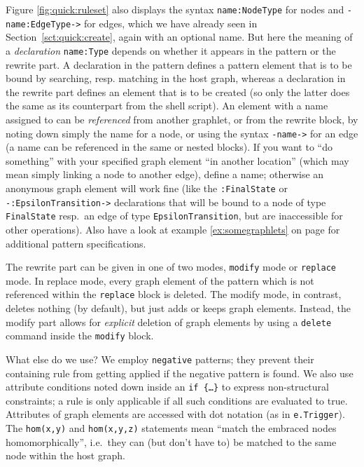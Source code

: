 Figure \ref{fig:quick:ruleset} also displays the syntax \texttt{name:NodeType} for nodes and \texttt{-name:EdgeType->} for edges, which we have already seen in Section~\ref{sct:quick:create}, again with an optional name.
But here the meaning of a \emph{declaration} \texttt{name:Type} depends on whether it appears in the pattern or the rewrite part.
A declaration in the pattern defines a pattern element that is to be bound by searching, resp. matching in the host graph, whereas a declaration in the rewrite part defines an element that is to be created (so only the latter does the same as its counterpart from the shell script).
An element with a name assigned to can be \emph{referenced} from another graphlet, or from the rewrite block, by noting down simply the name for a node, or using the syntax \texttt{-name->} for an edge (a name can be referenced in the same or nested blocks).
If you want to ``do something'' with your specified graph element ``in another location'' (which may mean simply linking a node to another edge), define a name; otherwise an anonymous graph element will work fine (like the \texttt{:FinalState} or \texttt{-:EpsilonTransition->} declarations that will be bound to a node of type \texttt{FinalState} resp.\ an edge of type \texttt{EpsilonTransition}, but are inaccessible for other operations).
Also have a look at example \ref{ex:somegraphlets} on page \pageref{ex:somegraphlets} for additional pattern specifications.

The rewrite part can be given in one of two modes, \texttt{modify} mode or \texttt{replace} mode.
In replace mode, every graph element of the pattern which is not referenced within the \texttt{replace} block is deleted.
The modify mode, in contrast, deletes nothing (by default), but just adds or keeps graph elements.
Instead, the modify part allows for \emph{explicit} deletion of graph elements by using a \texttt{delete} command inside the \texttt{modify} block.

What else do we use?
We employ \texttt{negative} patterns; they prevent their containing rule from getting applied if the negative pattern is found.
We also use attribute conditions noted down inside an \texttt{if \{\dots\}} to express non-structural constraints; a rule is only applicable if all such conditions are evaluated to true.
Attributes of graph elements are accessed with dot notation (as in \texttt{e.Trigger}).
The \texttt{hom(x,y)} and \texttt{hom(x,y,z)} statements mean ``match the embraced nodes homomorphically'', i.e.\ they can (but don't have to) be matched to the same node within the host graph.


